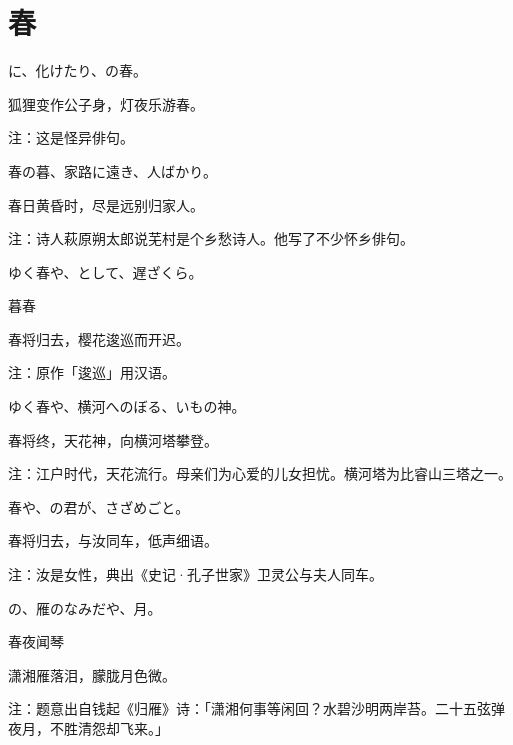 \newpage

\section{\FK 春}

\setcounter{haikucounter}{0}

\begin{haiku}
    {\FH {}に、化けたり、の春。}

    {\FK 狐狸变作公子身，灯夜乐游春。}

    {\FT 注：这是怪异俳句。}
\end{haiku}

\begin{haiku}
    {\FH 春の暮、家路に遠き、人ばかり。}

    {\FK 春日黄昏时，尽是远别归家人。}

    {\FT 注：诗人萩原朔太郎说芜村是个乡愁诗人。他写了不少怀乡俳句。}
\end{haiku}

\begin{haiku}
    {\FH ゆく春や、として、遅ざくら。}

    {\FK 暮春}

    {\FK 春将归去，樱花逡巡而开迟。}

    {\FT 注：原作「逡巡」用汉语。}
\end{haiku}

\begin{haiku}
    {\FH ゆく春や、横河へのぼる、いもの神。}

    {\FK 春将终，天花神，向横河塔攀登。}

    {\FT 注：江户时代，天花流行。母亲们为心爱的儿女担忧。横河塔为比睿山三塔之一。}
\end{haiku}

\begin{haiku}
    {\FH 春や、の君が、さざめごと。}

    {\FK 春将归去，与汝同车，低声细语。}

    {\FT 注：汝是女性，典出《史记·孔子世家》卫灵公与夫人同车。}
\end{haiku}

\begin{haiku}
    {\FH {}の、雁のなみだや、月。}

    {\FK 春夜闻琴}

    {\FK 潇湘雁落泪，朦胧月色微。}

    {\FT 注：题意出自钱起《归雁》诗：「潇湘何事等闲回？水碧沙明两岸苔。二十五弦弹夜月，不胜清怨却飞来。」}
\end{haiku}


